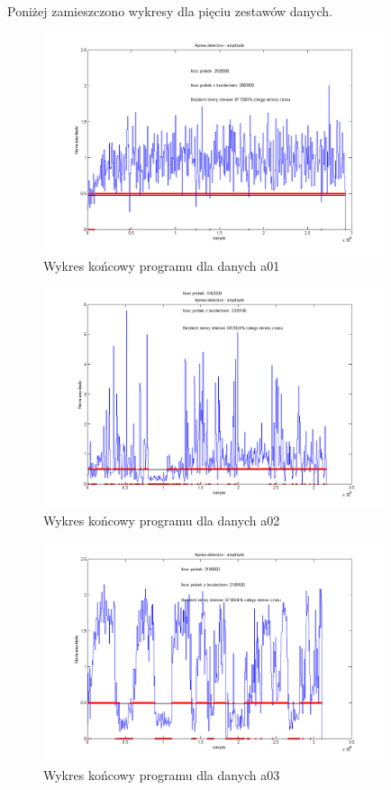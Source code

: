 Poniżej zamieszczono wykresy dla pięciu zestawów danych.

\begin{figure}[H]
\centering
\includegraphics[width=10cm]{SLEEP_APNEA/img/apnea1.png}
\caption{Wykres końcowy programu dla danych a01}
\label{fig:apnea_1}
\end{figure} 

\begin{figure}[H]
\centering
\includegraphics[width=10cm]{SLEEP_APNEA/img/apnea2.png}
\caption{Wykres końcowy programu dla danych a02}
\label{fig:apnea_2}
\end{figure} 

\begin{figure}[H]
\centering
\includegraphics[width=10cm]{SLEEP_APNEA/img/apnea3.png}
\caption{Wykres końcowy programu dla danych a03}
\label{fig:apnea_3}
\end{figure} 

